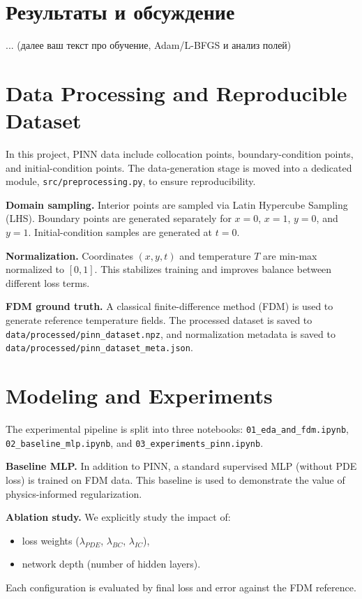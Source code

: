 \documentclass[conference]{IEEEtran}
\begin{document}
\section{Результаты и обсуждение}
... (далее ваш текст про обучение, Adam/L-BFGS и анализ полей)    



\section{Data Processing and Reproducible Dataset}
In this project, PINN data include collocation points, boundary-condition points, and initial-condition points. The data-generation stage is moved into a dedicated module, \texttt{src/preprocessing.py}, to ensure reproducibility.

\textbf{Domain sampling.} Interior points are sampled via Latin Hypercube Sampling (LHS). Boundary points are generated separately for $x=0$, $x=1$, $y=0$, and $y=1$. Initial-condition samples are generated at $t=0$.

\textbf{Normalization.} Coordinates $(x,y,t)$ and temperature $T$ are min-max normalized to $[0,1]$. This stabilizes training and improves balance between different loss terms.

\textbf{FDM ground truth.} A classical finite-difference method (FDM) is used to generate reference temperature fields. The processed dataset is saved to \texttt{data/processed/pinn\_dataset.npz}, and normalization metadata is saved to \texttt{data/processed/pinn\_dataset\_meta.json}.

\section{Modeling and Experiments}
The experimental pipeline is split into three notebooks:
\texttt{01\_eda\_and\_fdm.ipynb}, \texttt{02\_baseline\_mlp.ipynb}, and \texttt{03\_experiments\_pinn.ipynb}.

\textbf{Baseline MLP.} In addition to PINN, a standard supervised MLP (without PDE loss) is trained on FDM data. This baseline is used to demonstrate the value of physics-informed regularization.

\textbf{Ablation study.} We explicitly study the impact of:
\begin{itemize}
    \item loss weights ($\lambda_{PDE}$, $\lambda_{BC}$, $\lambda_{IC}$),
    \item network depth (number of hidden layers).
\end{itemize}
Each configuration is evaluated by final loss and error against the FDM reference.
\end{document}

